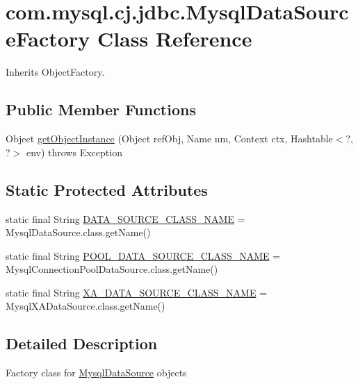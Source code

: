 \hypertarget{classcom_1_1mysql_1_1cj_1_1jdbc_1_1_mysql_data_source_factory}{}\section{com.\+mysql.\+cj.\+jdbc.\+Mysql\+Data\+Source\+Factory Class Reference}
\label{classcom_1_1mysql_1_1cj_1_1jdbc_1_1_mysql_data_source_factory}


Inherits Object\+Factory.

\subsection*{Public Member Functions}
\begin{DoxyCompactItemize}
\item 
Object \mbox{\hyperlink{classcom_1_1mysql_1_1cj_1_1jdbc_1_1_mysql_data_source_factory_afd5c1efe10779fca2f1c8582f3bc06f4}{get\+Object\+Instance}} (Object ref\+Obj, Name nm, Context ctx, Hashtable$<$?, ?$>$ env)  throws Exception 
\end{DoxyCompactItemize}
\subsection*{Static Protected Attributes}
\begin{DoxyCompactItemize}
\item 
static final String \mbox{\hyperlink{classcom_1_1mysql_1_1cj_1_1jdbc_1_1_mysql_data_source_factory_afa5044d66a28631a637646cbb49cfed6}{D\+A\+T\+A\+\_\+\+S\+O\+U\+R\+C\+E\+\_\+\+C\+L\+A\+S\+S\+\_\+\+N\+A\+ME}} = Mysql\+Data\+Source.\+class.\+get\+Name()
\item 
static final String \mbox{\hyperlink{classcom_1_1mysql_1_1cj_1_1jdbc_1_1_mysql_data_source_factory_aad3f278d5a9418a89f72416921e5f8b5}{P\+O\+O\+L\+\_\+\+D\+A\+T\+A\+\_\+\+S\+O\+U\+R\+C\+E\+\_\+\+C\+L\+A\+S\+S\+\_\+\+N\+A\+ME}} = Mysql\+Connection\+Pool\+Data\+Source.\+class.\+get\+Name()
\item 
static final String \mbox{\hyperlink{classcom_1_1mysql_1_1cj_1_1jdbc_1_1_mysql_data_source_factory_a638c5fed8d71a1a6e3a79e93eaa82711}{X\+A\+\_\+\+D\+A\+T\+A\+\_\+\+S\+O\+U\+R\+C\+E\+\_\+\+C\+L\+A\+S\+S\+\_\+\+N\+A\+ME}} = Mysql\+X\+A\+Data\+Source.\+class.\+get\+Name()
\end{DoxyCompactItemize}


\subsection{Detailed Description}
Factory class for \mbox{\hyperlink{classcom_1_1mysql_1_1cj_1_1jdbc_1_1_mysql_data_source}{Mysql\+Data\+Source}} objects 

